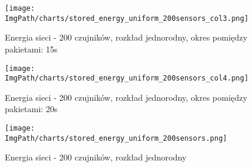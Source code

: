 \begin{figure}[!htbp]
	\begin{center}
		\texttt{[image: \\ImgPath/charts/stored\_energy\_uniform\_200sensors\_col3.png]}
	\end{center}
	\caption{Energia sieci - 200 czujników, rozkład jednorodny, okres pomiędzy pakietami: 15s}
\end{figure}

\begin{figure}[!htbp]
	\begin{center}
		\texttt{[image: \\ImgPath/charts/stored\_energy\_uniform\_200sensors\_col4.png]}
	\end{center}
	\caption{Energia sieci - 200 czujników, rozkład jednorodny, okres pomiędzy pakietami: 20s}
\end{figure}

\begin{figure}[!htbp]
	\begin{center}
		\texttt{[image: \\ImgPath/charts/stored\_energy\_uniform\_200sensors.png]}
	\end{center}
	\caption{Energia sieci - 200 czujników, rozkład jednorodny}
\end{figure}